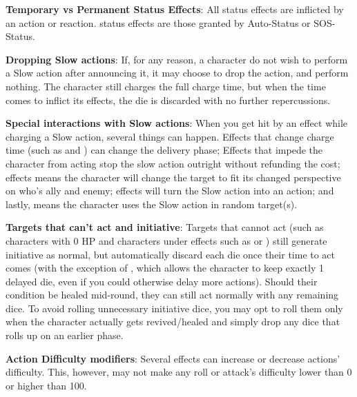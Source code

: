 \begin{multicols}{2}
\textbf{Temporary vs Permanent Status Effects}: All  status effects are inflicted by an action or reaction.  status effects are those granted by Auto-Status or SOS-Status.

\textbf{Dropping Slow actions}: If, for any reason, a character do not wish to perform a Slow action after announcing it, it may choose to drop the action, and perform nothing. The character still charges the full charge time, but when the time comes to inflict its effects, the die is discarded with no further repercussions.

\textbf{Special interactions with Slow actions}: When you get hit by an effect while charging a Slow action, several things can happen. Effects that change charge time (such as  and ) can change the delivery phase; Effects that impede the character from acting stop the slow action outright without refunding the cost;  effects means the character will change the target to fit its changed perspective on who's ally and enemy;  effects will turn the Slow action into an  action; and lastly,  means the character uses the Slow action in random target(s).

\textbf{Targets that can't act and initiative}: Targets that cannot act (such as characters with 0 HP and characters under effects such as  or ) still generate initiative as normal, but automatically discard each die once their time to act comes (with the exception of , which allows the character to keep exactly 1 delayed die, even if you could otherwise delay more actions). Should their condition be healed mid-round, they can still act normally with any remaining dice. To avoid rolling unnecessary initiative dice, you may opt to roll them only when the character actually gets revived/healed and simply drop any dice that rolls up on an earlier phase.

\textbf{Action Difficulty modifiers}: Several effects can increase or decrease actions' difficulty. This, however, may not make any roll or attack's difficulty lower than 0 or higher than 100. 

\end{multicols}
